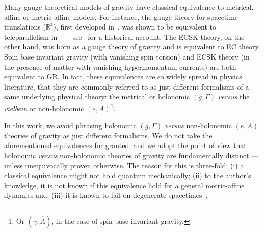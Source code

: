 \documentclass[../../main.tex]{subfiles}
\begin{document}
Many gauge-theoretical models of gravity have classical equivalence to metrical, affine or metric-affine models. For instance, the gauge theory for spacetime translations ($\mathbb{R}^4$), first developed in~\cite{hayashi1967}, was shown to be equivalent to teleparallelism in~\cite{cho1976,hayashi1977,hayashi1979} --- see~\cite{aldrovandi2013} for a historical account. The ECSK theory, on the other hand, was born as a gauge theory of gravity and is equivalent to EC theory. Spin base invariant gravity (with vanishing spin torsion) and ECSK theory (in the presence of matter with vanishing hypermomentum currents) are both equivalent to GR\@. In fact, these equivalences are so widely spread in physics literature, that they are commonly referred to as just different formalisms of a same underlying physical theory: the metrical or holonomic $(g,\Gamma)$ \textit{versus} the \textit{vielbein} or non-holonomic $(e,A)$\footnote{Or $(\gamma,\hat A)$, in the case of spin base invariant gravity.}.

In this work, we avoid phrasing holonomic $(g,\Gamma)$ \textit{versus} non-holonomic $(e,A)$ theories of gravity as just different formalisms. We do not take the aforementioned equivalences for granted, and we adopt the point of view that holonomic \textit{versus} non-holonomic theories of gravity are fundamentally distinct --- unless unequivocally proven otherwise. The reason for this is three-fold: (i) a classical equivalence might not hold quantum mechanically; (ii) to the author's knowledge, it is not known if this equivalence hold for a general metric-affine dynamics and; (iii) it is known to fail on degenerate spacetimes~\cite{kaul2016a,kaul2016b,kaul2019}.
\end{document}
